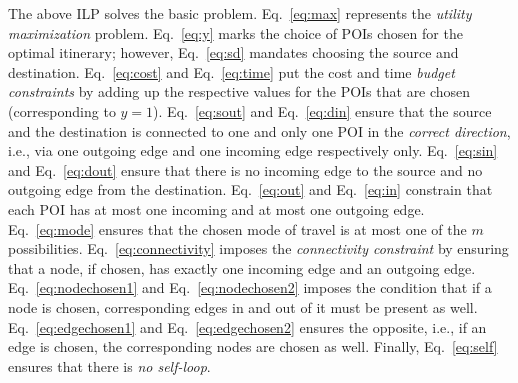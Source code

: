 The above ILP solves the basic \trip problem.  Eq.~\eqref{eq:max} represents the
\emph{utility maximization} problem.  Eq.~\eqref{eq:y} marks the choice of POIs
chosen for the optimal itinerary; however, Eq.~\eqref{eq:sd} mandates choosing
the source and destination.  Eq.~\eqref{eq:cost} and Eq.~\eqref{eq:time} put the
cost and time \emph{budget constraints} by adding up the respective values for
the POIs that are chosen (corresponding to $y = 1$).  Eq.~\eqref{eq:sout} and
Eq.~\eqref{eq:din} ensure that the source and the destination is connected to
one and only one POI in the \emph{correct direction}, i.e., via one outgoing
edge and one incoming edge respectively only.  Eq.~\eqref{eq:sin} and
Eq.~\eqref{eq:dout} ensure that there is no incoming edge to the source and no
outgoing edge from the destination.  Eq.~\eqref{eq:out} and Eq.~\eqref{eq:in}
constrain that each POI has at most one incoming and at most one outgoing edge.
Eq.~\eqref{eq:mode} ensures that the chosen mode of travel is at most one of the
$m$ possibilities.  Eq.~\eqref{eq:connectivity} imposes the \emph{connectivity
constraint} by ensuring that a node, if chosen, has exactly one incoming edge
and an outgoing edge.  Eq.~\eqref{eq:nodechosen1} and Eq.~\eqref{eq:nodechosen2}
imposes the condition that if a node is chosen, corresponding edges in and out
of it must be present as well.  Eq.~\eqref{eq:edgechosen1} and
Eq.~\eqref{eq:edgechosen2} ensures the opposite, i.e., if an edge is chosen, the
corresponding nodes are chosen as well.  Finally, Eq.~\eqref{eq:self} ensures
that there is \emph{no self-loop}.

